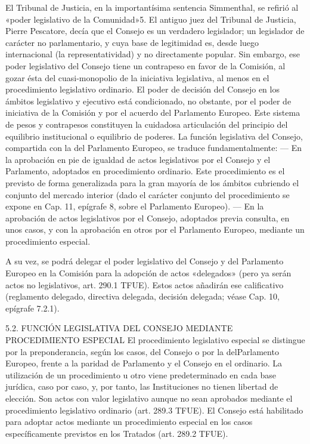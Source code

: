 \documentclass[10pt,a4paper]{article}
\begin{document}
El Tribunal de Justicia, en la importantísima sentencia Simmenthal, se refirió al «poder legislativo de la Comunidad»5. El antiguo juez del Tribunal de Justicia, Pierre Pescatore, decía que el Consejo es un verdadero legislador; un legislador de carácter no parlamentario, y cuya base de legitimidad es, desde luego internacional (la representatividad) y no directamente popular. Sin embargo, ese poder legislativo del Consejo tiene un contrapeso en favor de la Comisión, al gozar ésta del cuasi-monopolio de la iniciativa legislativa, al menos en el procedimiento legislativo ordinario. El poder de decisión del Consejo en los ámbitos legislativo y ejecutivo está condicionado, no obstante, por el poder de iniciativa de la Comisión y por el acuerdo del Parlamento Europeo. Este sistema de pesos y contrapesos constituyen la cuidadosa articulación del principio del equilibrio institucional o equilibrio de poderes.
La función legislativa del Consejo, compartida con la del Parlamento Europeo, se traduce fundamentalmente:
— En la aprobación en pie de igualdad de actos legislativos por el Consejo y el Parlamento, adoptados en procedimiento ordinario. Este procedimiento es el previsto de forma generalizada para la gran mayoría de los ámbitos cubriendo el conjunto del mercado interior (dado el carácter conjunto del procedimiento se expone en Cap. 11, epígrafe 8, sobre el Parlamento Europeo).
— En la aprobación de actos legislativos por el Consejo, adoptados previa consulta, en unos casos, y con la aprobación en otros por el Parlamento Europeo, mediante un procedimiento especial.

A su vez, se podrá delegar el poder legislativo del Consejo y del Parlamento Europeo en la Comisión para la adopción de actos «delegados» (pero ya serán actos no legislativos, art. 290.1 TFUE). Estos actos añadirán ese calificativo (reglamento delegado, directiva delegada, decisión delegada; véase Cap. 10, epígrafe 7.2.1). 

5.2. FUNCIÓN LEGISLATIVA DEL CONSEJO MEDIANTE PROCEDIMIENTO ESPECIAL
El procedimiento legislativo especial se distingue por la preponderancia, según los casos, del Consejo o por la delParlamento Europeo, frente a la paridad de Parlamento y el Consejo en el ordinario. La utilización de un procedimiento u otro viene predeterminado en cada base jurídica, caso por caso, y, por tanto, las Instituciones no tienen libertad de elección. Son actos con valor legislativo aunque no sean aprobados mediante el procedimiento legislativo ordinario (art. 289.3 TFUE). El Consejo está habilitado para adoptar actos mediante un procedimiento especial en los casos específicamente previstos en los Tratados (art. 289.2 TFUE).
\end{document}
